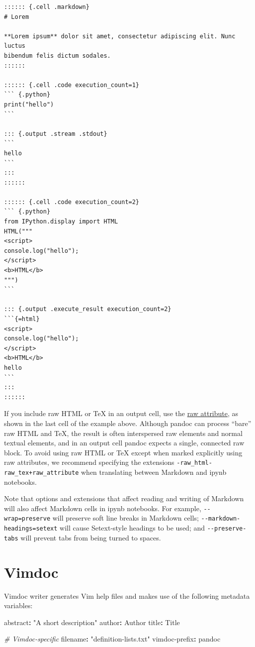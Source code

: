 \documentclass[
]{article}
\newenvironment{Shaded}{}{}
\newcommand{\AttributeTok}[1]{\textcolor[rgb]{0.49,0.56,0.16}{#1}}
\newcommand{\CommentTok}[1]{\textcolor[rgb]{0.38,0.63,0.69}{\textit{#1}}}
\newcommand{\FunctionTok}[1]{\textcolor[rgb]{0.02,0.16,0.49}{#1}}
\newcommand{\KeywordTok}[1]{\textcolor[rgb]{0.00,0.44,0.13}{\textbf{#1}}}
\newcommand{\StringTok}[1]{\textcolor[rgb]{0.25,0.44,0.63}{#1}}
\begin{document}
\begin{verbatim}
:::::: {.cell .markdown}
# Lorem

**Lorem ipsum** dolor sit amet, consectetur adipiscing elit. Nunc luctus
bibendum felis dictum sodales.
::::::

:::::: {.cell .code execution_count=1}
``` {.python}
print("hello")
```

::: {.output .stream .stdout}
```
hello
```
:::
::::::

:::::: {.cell .code execution_count=2}
``` {.python}
from IPython.display import HTML
HTML("""
<script>
console.log("hello");
</script>
<b>HTML</b>
""")
```

::: {.output .execute_result execution_count=2}
```{=html}
<script>
console.log("hello");
</script>
<b>HTML</b>
hello
```
:::
::::::
\end{verbatim}

If you include raw HTML or TeX in an output cell, use the
\protect\hyperlink{extension-raw_attribute}{raw attribute}, as shown in
the last cell of the example above. Although pandoc can process ``bare''
raw HTML and TeX, the result is often interspersed raw elements and
normal textual elements, and in an output cell pandoc expects a single,
connected raw block. To avoid using raw HTML or TeX except when marked
explicitly using raw attributes, we recommend specifying the extensions
\texttt{-raw\_html-raw\_tex+raw\_attribute} when translating between
Markdown and ipynb notebooks.

Note that options and extensions that affect reading and writing of
Markdown will also affect Markdown cells in ipynb notebooks. For
example, \texttt{-\/-wrap=preserve} will preserve soft line breaks in
Markdown cells; \texttt{-\/-markdown-headings=setext} will cause
Setext-style headings to be used; and \texttt{-\/-preserve-tabs} will
prevent tabs from being turned to spaces.

\hypertarget{vimdoc}{%
\section{Vimdoc}\label{vimdoc}}

Vimdoc writer generates Vim help files and makes use of the following
metadata variables:

\begin{Shaded}
\begin{Highlighting}[]
\FunctionTok{abstract}\KeywordTok{:}\AttributeTok{ }\StringTok{"A short description"}
\FunctionTok{author}\KeywordTok{:}\AttributeTok{ Author}
\FunctionTok{title}\KeywordTok{:}\AttributeTok{ Title}

\CommentTok{\# Vimdoc{-}specific}
\FunctionTok{filename}\KeywordTok{:}\AttributeTok{ }\StringTok{"definition{-}lists.txt"}
\FunctionTok{vimdoc{-}prefix}\KeywordTok{:}\AttributeTok{ pandoc}
\end{Highlighting}
\end{Shaded}
\end{document}
